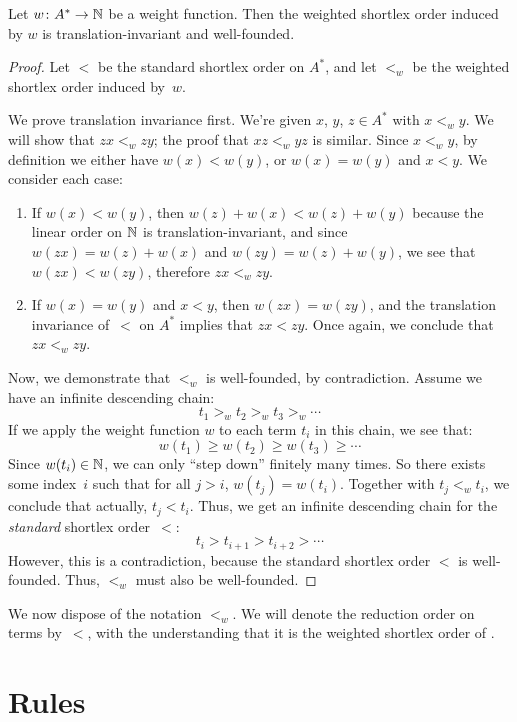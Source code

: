 \documentclass[../generics]{subfiles}
\begin{document}
\begin{proposition} Let $w\colon A^*\rightarrow\mathbb{N}$ be a weight function. Then the weighted shortlex order induced by $w$ is translation-invariant and well-founded.
\end{proposition}
\begin{proof}
Let $<$ be the standard shortlex order on $A^*$, and let $<_w$ be the weighted shortlex order induced by~$w$.

We prove translation invariance first. We're given $x$, $y$, $z\in A^*$ with $x<_w y$. We will show that $zx<_w zy$; the proof that $xz<_w yz$ is similar. Since $x<_w y$, by definition we either have $w(x)<w(y)$, or $w(x)=w(y)$ and $x<y$. We consider each case:
\begin{enumerate}
\item If $w(x)<w(y)$, then $w(z)+w(x)<w(z)+w(y)$ because the linear order on $\mathbb{N}$ is translation-invariant, and since $w(zx)=w(z)+w(x)$ and $w(zy)=w(z)+w(y)$, we see that $w(zx)<w(zy)$, therefore $zx <_w zy$.
\item If $w(x)=w(y)$ and $x<y$, then $w(zx)=w(zy)$, and the translation invariance of~$<$ on $A^*$ implies that $zx<zy$. Once again, we conclude that $zx <_w zy$.
\end{enumerate}
Now, we demonstrate that $<_w$ is well-founded, by contradiction. Assume we have an infinite descending chain:
\[ t_1 >_w t_2 >_w t_3 >_w \cdots \]
If we apply the weight function $w$ to each term $t_i$ in this chain, we see that:
\[ w(t_1) \geq w(t_2) \geq w(t_3) \geq \cdots \]
Since $w(t_i)\in\mathbb{N}$, we can only ``step down'' finitely many times. So there exists some index~$i$ such that for all $j>i$, $w(t_j)=w(t_i)$. Together with $t_j <_w t_i$, we conclude that actually, $t_j < t_i$. Thus, we get an infinite descending chain for the \emph{standard} shortlex order~$<$:
\[ t_i > t_{i+1} > t_{i+2} > \cdots \]
However, this is a contradiction, because the standard shortlex order $<$ is well-founded. Thus, $<_w$ must also be well-founded.
\end{proof}
We now dispose of the notation $<_w$. We will denote the reduction order on terms by~$<$, with the understanding that it is the weighted shortlex order of .

\section{Rules}\label{sec:rqm rules}
\end{document}
